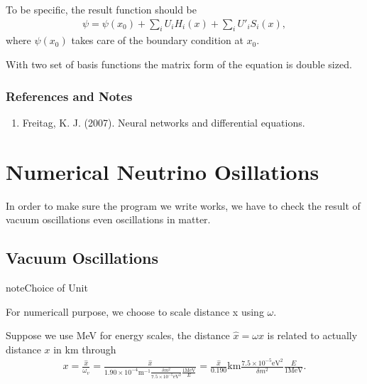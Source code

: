 \documentclass[letterpaper,12pt,english]{sphinxmanual}
\begin{document}
To be specific, the result function should be
\begin{equation*}
\begin{split}\psi = \psi(x_0) + \sum_i U_i H_i(x) + \sum_i U'_i S_i(x),\end{split}
\end{equation*}
where \(\psi(x_0)\) takes care of the boundary condition at \(x_0\).

With two set of basis functions the matrix form of the equation is double sized.


\subsection{References and Notes}
\label{\detokenize{finite-element-method/collocation-method:references-and-notes}}\begin{enumerate}
\item {} 
Freitag, K. J. (2007). Neural networks and differential equations.

\end{enumerate}


\chapter{Numerical Neutrino Osillations}
\label{\detokenize{neutrino-oscillations/index::doc}}\label{\detokenize{neutrino-oscillations/index:numerical-neutrino-osillations}}
In order to make sure the program we write works, we have to check the result of vacuum oscillations even oscillations in matter.


\section{Vacuum Oscillations}
\label{\detokenize{neutrino-oscillations/vacuum-oscillations::doc}}\label{\detokenize{neutrino-oscillations/vacuum-oscillations:vacuum-oscillations}}
\begin{sphinxadmonition}{note}{Choice of Unit}

For numericall purpose, we choose to scale distance x using \(\omega\).

Suppose we use MeV for energy scales, the distance \(\hat x = \omega x\) is related to actually distance \(x\) in km through
\begin{equation*}
\begin{split}x = \frac{\hat x}{\omega_v} = \frac{\hat x}{  1.90\times 10^{-4}  \mathrm{m}^{-1}  \frac{\delta m^2}{7.5\times 10^{-5}\mathrm{eV}^2} \frac{1\mathrm{MeV}}{E} } = \frac{\hat x}{0.190} \mathrm{km} \frac{7.5\times 10^{-5}\mathrm{eV}^2}{\delta m^2}  \frac{E}{1\mathrm{MeV}}.\end{split}
\end{equation*}\end{sphinxadmonition}
\end{document}
